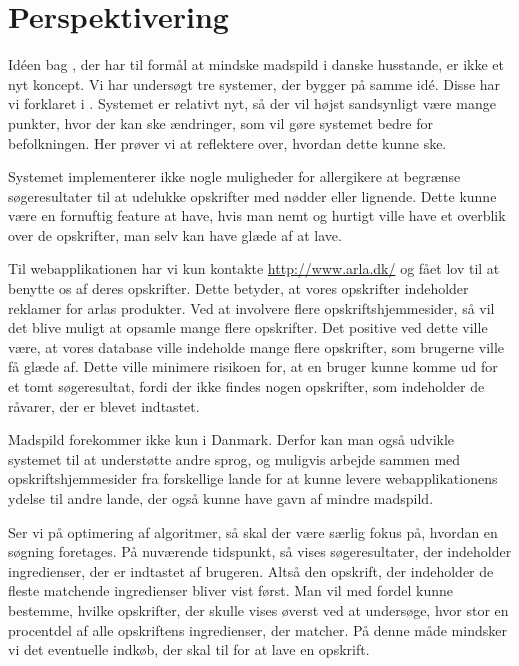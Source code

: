 \section{Perspektivering}
\label{sec:perspektivering}
Idéen bag \Foodl{}, der har til formål at mindske madspild i danske husstande, er ikke et nyt koncept. Vi har undersøgt tre systemer, der bygger på samme idé. Disse har vi forklaret i . Systemet er relativt nyt, så der vil højst sandsynligt være mange punkter, hvor der kan ske ændringer, som vil gøre systemet bedre for befolkningen. Her prøver vi at reflektere over, hvordan dette kunne ske.

Systemet \Foodl{} implementerer ikke nogle muligheder for \fx allergikere at begrænse søgeresultater til \fx at udelukke opskrifter med nødder eller lignende. Dette kunne være en fornuftig feature at have, hvis man nemt og hurtigt ville have et overblik over de opskrifter, man selv kan have glæde af at lave.

Til webapplikationen \Foodl{} har vi kun kontakte \url{http://www.arla.dk/} og fået lov til at benytte os af deres opskrifter. Dette betyder, at vores opskrifter indeholder reklamer for arlas produkter. Ved at involvere flere opskriftshjemmesider, så vil det blive muligt at opsamle mange flere opskrifter. Det positive ved dette ville være, at vores database ville indeholde mange flere opskrifter, som brugerne ville få glæde af. Dette ville minimere risikoen for, at en bruger kunne komme ud for et tomt søgeresultat, fordi der ikke findes nogen opskrifter, som indeholder de råvarer, der er blevet indtastet.

Madspild forekommer ikke kun i Danmark. Derfor kan man også udvikle systemet til at understøtte andre sprog, og muligvis arbejde sammen med opskriftshjemmesider fra forskellige lande for at kunne levere webapplikationens ydelse til andre lande, der også kunne have gavn af mindre madspild.

Ser vi på optimering af algoritmer, så skal der være særlig fokus på, hvordan en søgning foretages. På nuværende tidspunkt, så vises søgeresultater, der indeholder ingredienser, der er indtastet af brugeren. Altså den opskrift, der indeholder de fleste matchende ingredienser bliver vist først. Man vil med fordel kunne bestemme, hvilke opskrifter, der skulle vises øverst ved at undersøge, hvor stor en procentdel af alle opskriftens ingredienser, der matcher. På denne måde mindsker vi det eventuelle indkøb, der skal til for at lave en opskrift. 

